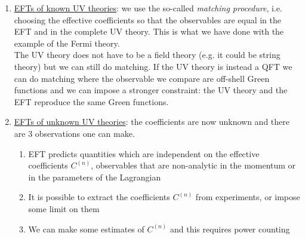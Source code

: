 \documentclass[../main.tex]{subfiles}
\begin{document}
\begin{enumerate}
    \item \underline{EFTs of known UV theories}: we use the so-called \textit{matching procedure}, i.e. choosing the effective coefficients so that the observables are equal in the EFT and in the complete UV theory. This is what we have done with the example of the Fermi theory.\\
    The UV theory does not have to be a field theory (e.g. it could be string theory) but we can still do matching. If the UV theory is instead a QFT we can do matching where the observable we compare are off-shell Green functions and we can impose a stronger constraint: the UV theory and the EFT reproduce the same Green functions.
    \item \underline{EFTs of unknown UV theories}: the coefficients are now unknown and there are 3 observations one can make.
    \begin{enumerate}
        \item EFT predicts quantities which are independent on the effective coefficients $C^{(n)}$, observables that are non-analytic in the momentum or in the parameters of the Lagrangian
        \item It is possible to extract the coefficients $C^{(n)}$ from experiments, or impose some limit on them
        \item We can make some estimates of $C^{(n)}$ and this requires power counting
    \end{enumerate}
\end{enumerate}
\end{document}
